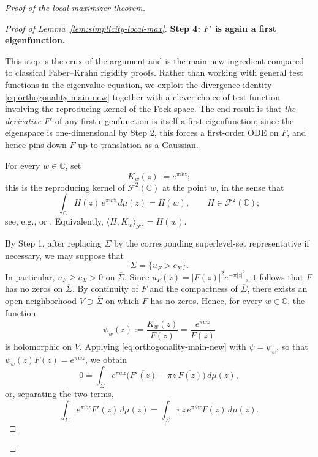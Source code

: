 \documentclass[a4paper,11pt,reqno]{amsart}
\numberwithin{equation}{section}
\theoremstyle{plain} %
\theoremstyle{definition} %
\theoremstyle{remark}
\newcommand{\C}{\mathbb{C}}
\begin{document}
\begin{proof}[Proof of the local-maximizer theorem]
\begin{proof}[Proof of Lemma~\ref{lem:simplicity-local-max}]
\medskip
\noindent
{\bf Step 4: \(F'\) is again a first eigenfunction.}

This step is the crux of the argument and is the main new ingredient compared
to classical Faber--Krahn rigidity proofs. Rather than working with general
test functions in the eigenvalue equation, we exploit the divergence identity
\eqref{eq:orthogonality-main-new} together with a clever choice of test
function involving the reproducing kernel of the Fock space. The end result is
that \emph{the derivative} \(F'\) of any first eigenfunction is itself a first
eigenfunction; since the eigenspace is one-dimensional by Step 2, this forces
a first-order ODE on \(F\), and hence pins down \(F\) up to translation as a
Gaussian.

For every \(w\in \C\), set
\[
K_w(z):=e^{\pi \overline w z};
\]
this is the reproducing kernel of \(\mathcal F^2(\C)\) at the point \(w\), in
the sense that
\begin{equation}\label{eq:reproducing-kernel}
\int_\C H(z)\,e^{\pi w \overline z}\,d\mu(z)=H(w),
\qquad H\in\mathcal F^2(\C);
\end{equation}
see, e.g., \cite[Ch.~1]{Folland} or \cite{Bargmann}. Equivalently,
\(\langle H,K_w\rangle_{\mathcal F^2}=H(w)\).

By Step 1, after replacing \(\Sigma\) by the corresponding superlevel-set
representative if necessary, we may suppose that
\[
\Sigma=\{u_F>c_\Sigma\}.
\]
In particular, \(u_F\ge c_\Sigma>0\) on \(\overline \Sigma\). Since
\(u_F(z)=|F(z)|^2e^{-\pi |z|^2}\), it follows that \(F\) has no zeros on
\(\overline \Sigma\). By continuity of \(F\) and the compactness of
\(\overline \Sigma\), there exists an open neighborhood
\(V\supset \overline \Sigma\) on which \(F\) has no zeros. Hence, for every
\(w\in \C\), the function
\[
\psi_w(z):=\frac{K_w(z)}{F(z)}=\frac{e^{\pi\overline wz}}{F(z)}
\]
is holomorphic on \(V\). Applying \eqref{eq:orthogonality-main-new} with
\(\psi=\psi_w\), so that
\(\psi_w(z)F(z)=e^{\pi\overline w z}\), we obtain
\[
0=
\int_\Sigma
e^{\pi \overline wz}
\Big(\overline{F'(z)}-\pi z\,\overline{F(z)}\Big)\,d\mu(z),
\]
or, separating the two terms,
\begin{equation}\label{eq:key-kernel-identity-new}
\int_\Sigma
e^{\pi \overline wz}\overline{F'(z)}\,d\mu(z)
=
\int_\Sigma
\pi z\,e^{\pi \overline wz}\overline{F(z)}\,d\mu(z).
\end{equation}


\end{proof}
\end{proof}
\end{document}
